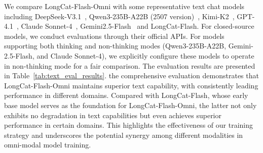 \documentclass{article}
\newcommand{\longcat}{LongCat-Flash-Omni\xspace}
\begin{document}
We compare \longcat with some representative text chat models including DeepSeek-V3.1~\citep{deepseekai2025deepseekv3technicalreport}, Qwen3-235B-A22B (2507 version)~\citep{yang2025qwen3}, Kimi-K2~\citep{Kimi_K2_web_doc}, GPT-4.1~\citep{gpt4.1}, Claude Sonnet-4~\citep{claude4}, Gemini2.5-Flash~\citep{comanici2025gemini} and LongCat-Flash\citep{meituan2025longcat_flash_chat}. For closed-source models, we conduct evaluations through their official APIs. For models supporting both thinking and non-thinking modes (Qwen3-235B-A22B, Gemini-2.5-Flash, and Claude Sonnet-4), we explicitly configure these models to operate in non-thinking mode for a fair comparison.
The evaluation results are presented in Table~\ref{tab:text_eval_results}. the comprehensive evaluation demonstrates that \longcat maintains superior text capability, with consistently leading performance in different domains. Compared with LongCat-Flash, whose early base model serves as the foundation for LongCat-Flash-Omni, the latter not only exhibits no degradation in text capabilities but even achieves superior performance in certain domains. This highlights the effectiveness of our training strategy and underscores the potential synergy among different modalities in omni-modal model training.


\end{document}
